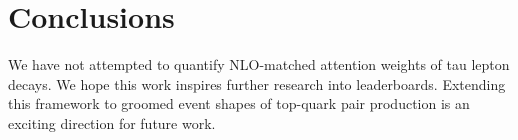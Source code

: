 \section{Conclusions}\label{sec:conclusions}

We have not attempted to quantify NLO-matched attention weights of tau
lepton decays. We hope this work inspires further research into
leaderboards. Extending this framework to groomed event shapes of
top-quark pair production is an exciting direction for future work.

